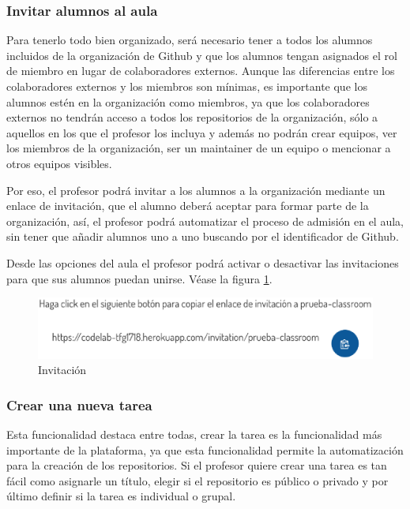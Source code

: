 \newpage
\subsubsection{Invitar alumnos al aula}

Para tenerlo todo bien organizado, será necesario tener a todos los alumnos incluidos de la organización de Github y que los alumnos tengan asignados el rol de miembro en lugar de colaboradores externos. Aunque las diferencias entre los colaboradores externos y los miembros son mínimas, 
es importante que los alumnos estén en la organización como miembros, ya que los colaboradores externos no tendrán acceso a todos los repositorios de la organización, sólo a aquellos en los que el profesor los incluya y además no podrán crear equipos, 
ver los miembros de la organización, ser un maintainer de un equipo o mencionar a otros equipos visibles.

Por eso, el profesor podrá invitar a los alumnos a la organización mediante un enlace de invitación, que el alumno deberá aceptar para formar parte de la organización, así, el profesor podrá automatizar 
el proceso de admisión en el aula, sin tener que añadir alumnos uno a uno buscando por el identificador de Github.

Desde las opciones del aula el profesor podrá activar o desactivar las invitaciones para que sus alumnos puedan unirse.
Véase la figura \ref{fig:Invitacion}.

\begin{figure}[!th]
\begin{center}
\includegraphics[scale=0.8]{images/invitacion}
\caption{Invitación}
\label{fig:Invitacion}
\end{center}
\end{figure}

\subsubsection{Crear una nueva tarea}

Esta funcionalidad destaca entre todas, crear la tarea es la funcionalidad más importante de la plataforma, ya que esta funcionalidad permite la automatización para la creación de los repositorios.
Si el profesor quiere crear una tarea es tan fácil como asignarle un título, elegir si el repositorio es público o privado y por último definir si la tarea es individual o grupal.


